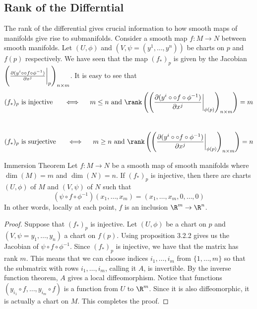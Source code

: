 \documentclass[a4paper]{article}
\begin{document}
\subsection{Rank of the Differntial}
The rank of the differential gives crucial information to how smooth maps of manifolds give rise to submanifolds. Consider a smooth map $f:M\to N$ between smooth manifolds. Let $(U,\phi)$ and $(V,\psi=(y^1,\dots,y^n))$ be charts on $p$ and $f(p)$ respectively. We have seen that the map $(f_\ast)_p$ is given by the Jacobian $\left(\frac{\partial(y^i\circ\circ f\circ\phi^{-1})}{\partial x^j}\bigg{|}_p\right)_{n\times m}$. It is easy to see that $$(f_\ast)_p\text{ is injective }\;\;\;\;\iff\;\;\;\;m\leq n\text{ and }\rank\left(\left(\frac{\partial(y^i\circ\circ f\circ\phi^{-1})}{\partial x^j}\bigg{|}_{\phi(p)}\right)_{n\times m}\right)=m$$~$$(f_\ast)_p\text{ is surjective }\;\;\;\;\iff\;\;\;\;m\geq n\text{ and }\rank\left(\left(\frac{\partial(y^i\circ\circ f\circ\phi^{-1})}{\partial x^j}\bigg{|}_{\phi(p)}\right)_{n\times m}\right)=n$$ 

\begin{thm}{Immersion Theorem}{} Let $f:M\to N$ be a smooth map of smooth manifolds where $\dim(M)=m$ and $\dim(N)=n$. If $(f_\ast)_p$ is injective, then there are charts $(U,\phi)$ of $M$ and $(V,\psi)$ of $N$ such that $$(\psi\circ f\circ\phi^{-1})(x_1,\dots,x_m)=(x_1,\dots,x_m,0,\dots,0)$$ In other words, locally at each point, $f$ is an inclusion $\R^m\to\R^n$. 
\begin{proof}
Suppose that $(f_\ast)_p$ is injective. Let $(U,\phi)$ be a chart on $p$ and $(V,\psi=y_1,\dots,y_n)$ a chart on $f(p)$. Using proposition 3.2.2 gives us the Jacobian of $\psi\circ f\circ\phi^{-1}$. Since $(f_\ast)_p$ is injective, we have that the matrix has rank $m$. This means that we can choose indices $i_1,\dots,i_m$ from $\{1,\dots,m\}$ so that the submatrix with rows $i_1,\dots,i_m$, calling it $A$, is invertible. By the inverse function theorem, $A$ gives a local diffeomorphism. Notice that functions $(y_{i_1}\circ f,\dots,y_{i_m}\circ f)$ is a function from $U$ to $\R^m$. Since it is also diffeomorphic, it is actually a chart on $M$. This completes the proof. 
\end{proof}
\end{thm}
\end{document}
